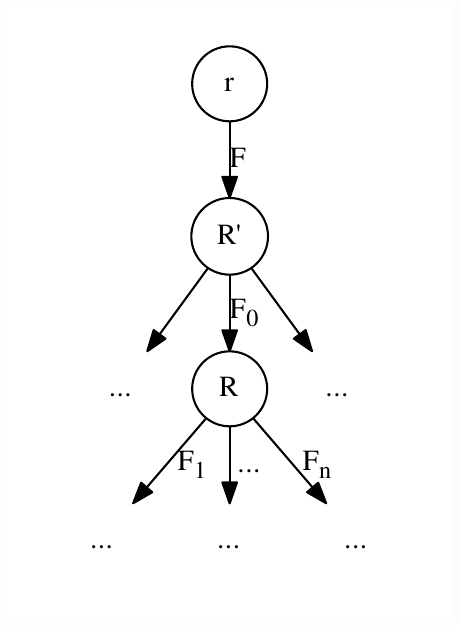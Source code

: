 \documentclass[10pt]{beamer}
\begin{document}
\begin{frame}
\begin{columns}
\begin{column}{.4\textwidth}
      \includegraphics[width=\textwidth]{derivation_tree}
    \end{column}
  \end{columns}
\end{frame}

{\aauwavesbg
\begin{frame}
\end{frame}}
\end{document}
